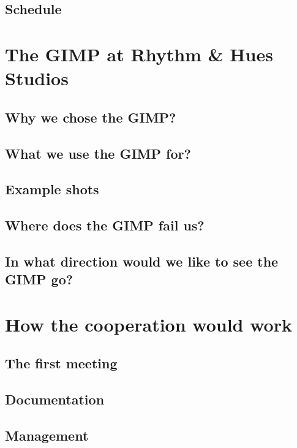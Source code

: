 \documentclass{report}
\begin{document}
\section{Schedule}

\chapter{The GIMP at Rhythm \& Hues Studios}

\section{Why we chose the GIMP?}

\section{What we use the GIMP for?}

\section{Example shots}

\section{Where does the GIMP fail us?}

\section{In what direction would we like to see the GIMP go?} 


\chapter{How the cooperation would work}

\section{The first meeting}
\section{Documentation}
\section{Management}
\end{document}
